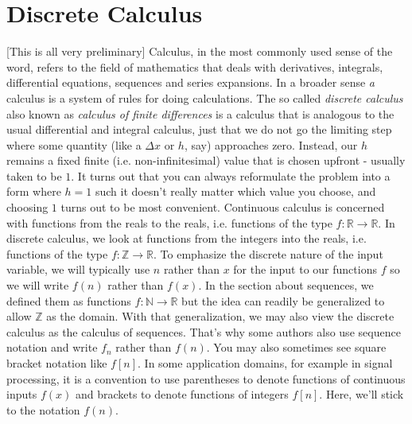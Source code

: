 \chapter{Discrete Calculus}
[This is all very preliminary] Calculus, in the most commonly used sense of the word, refers to the field of mathematics that deals with derivatives, integrals, differential equations, sequences and series expansions. In a broader sense \emph{a} calculus is a system of rules for doing calculations. The so called \emph{discrete calculus} also known as \emph{calculus of finite differences} is a calculus that is analogous to the usual differential and integral calculus, just that we do not go the limiting step where some quantity (like a $\Delta x$ or $h$, say) approaches zero. Instead, our $h$ remains a fixed finite (i.e. non-infinitesimal) value that is chosen upfront - usually taken to be $1$. It turns out that you can always reformulate the problem into a form where $h = 1$ such it doesn't really matter which value you choose, and choosing $1$ turns out to be most convenient. Continuous calculus is concerned with functions from the reals to the reals, i.e. functions of the type $f: \mathbb{R} \rightarrow \mathbb{R}$. In discrete calculus, we look at functions from the integers into the reals, i.e. functions of the type $f: \mathbb{Z} \rightarrow \mathbb{R}$. To emphasize the discrete nature of the input variable, we will typically use $n$ rather than $x$ for the input to our functions $f$ so we will write $f(n)$ rather than $f(x)$. In the section about sequences, we defined them as functions $f: \mathbb{N} \rightarrow \mathbb{R}$ but the idea can readily be generalized to allow $\mathbb{Z}$ as the domain. With that generalization, we may also view the discrete calculus as the calculus of sequences. That's why some authors also use sequence notation and write $f_n$ rather than $f(n)$. You may also sometimes see square bracket notation like $f[n]$. In some application domains, for example in signal processing, it is a convention to use parentheses to denote functions of continuous inputs $f(x)$ and brackets to denote functions of integers $f[n]$. Here, we'll stick to the notation $f(n)$.





